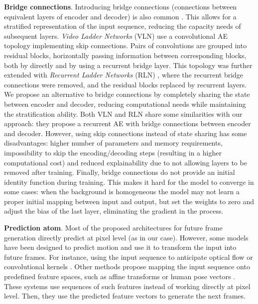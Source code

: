 \documentclass[runningheads]{llncs}
\begin{document}
\textbf{Bridge connections}. Introducing bridge connections (connections between equivalent layers of encoder and decoder) is also common \cite{finn2016unsupervised,liu2017video,cricri2016video,villegas2017decomposing}. This allows for a stratified representation of the input sequence, reducing the capacity needs of subsequent layers. \emph{Video Ladder Networks} (VLN) \cite{cricri2016video} use a convolutional AE topology implementing skip connections. Pairs of convolutions are grouped into residual blocks, horizontally passing information between corresponding blocks, both by directly and by using a recurrent bridge layer. This topology was further extended with \emph{Recurrent Ladder Networks} (RLN) \cite{ilin2017recurrent}, where the recurrent bridge connections were removed, and the residual blocks replaced by recurrent layers. We propose an alternative to bridge connections by completely sharing the state between encoder and decoder, reducing computational needs while maintaining the stratification ability. 
Both VLN and RLN share some similarities with our approach: they propose a recurrent AE with bridge connections between encoder and decoder. However, using skip connections instead of state sharing has some disadvantages: higher number of parameters and memory requirements, impossibility to skip the encoding/decoding steps (resulting in a higher computational cost) and reduced explainability due to not allowing layers to be removed after training. Finally, bridge connections do not provide an initial identity function during training. This makes it hard for the model to converge in some cases: when the background is homogeneous the model may not learn a proper initial mapping between input and output, but set the weights to zero and adjust the bias of the last layer, eliminating the gradient in the process.

\textbf{Prediction atom}. Most of the proposed architectures for future frame generation directly predict at pixel level (as in our case).
However, some models have been designed to predict motion and use it to transform the input into future frames. For instance, using the input sequence to anticipate optical flow \cite{liu2017video,patraucean2015spatio} or convolutional kernels \cite{brabandere2016dfn,xue2016visual}. Other methods propose mapping the input sequence onto predefined feature spaces, such as affine transforms \cite{amersfoort2017transformation} or human pose vectors \cite{walker2017pose}. These systems use sequences of such features instead of working directly at pixel level. Then, they use the predicted feature vectors to generate the next frames. 
\end{document}
